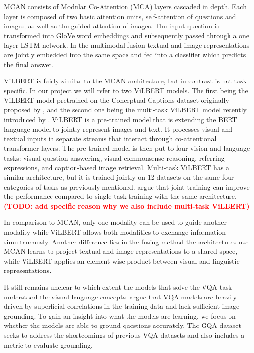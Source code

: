 \documentclass{article}
\newcommand{\todo}[1]{\textbf{\textcolor{Red}{(TODO: #1)}}}
\begin{document}
MCAN consists of Modular Co-Attention (MCA) layers cascaded in depth. Each layer is composed of two basic attention units, self-attention of questions and images, as well as the guided-attention of images. The input question is transformed into GloVe word embeddings and subsequently passed through a one layer LSTM network. In the multimodal fusion textual and image representations are jointly embedded into the same space and fed into a classifier which predicts the final answer.

ViLBERT is fairly similar to the MCAN architecture, but in contrast is not task specific. In our project we will refer to two ViLBERT models. The first being the ViLBERT model pretrained on the Conceptual Captions dataset originally proposed by \cite{lu2019vilbert}, and the second one being the multi-task ViLBERT model recently introduced by \cite{lu2020multitask}. ViLBERT is a pre-trained model that is extending the BERT language model to jointly represent images and text. It processes visual and textual inputs in separate streams that interact through co-attentional transformer layers. The pre-trained model is then put to four vision-and-language tasks: visual question answering, visual commonsense reasoning, referring expressions, and caption-based image retrieval. Multi-task ViLBERT has a similar architecture, but it is trained jointly on 12 datasets on the same four categories of tasks as previously mentioned. \cite{lu2020multitask} argue that joint training can improve the performance compared to single-task training with the same architecture. \todo{add specific reason why we also include multi-task ViLBERT}

In comparison to MCAN, only one modality can be used to guide another modality while ViLBERT allows both modalities to exchange information simultaneously. Another difference lies in the fusing method the architectures use. MCAN learns to project textual and image representations to a shared space, while ViLBERT applies an element-wise product between visual and linguistic representations.

It still remains unclear to which extent the models that solve the VQA task understood the visual-language concepts. \cite{agrawal12018gvqa} argue that VQA models are heavily driven by superficial correlations in the training data and lack sufficient image grounding. To gain an insight into what the models are learning, we focus on whether the models are able to ground questions accurately. The GQA dataset \citep{hudson2019gqa} seeks to address the shortcomings of previous VQA datasets and also includes a metric to evaluate grounding.
\end{document}
